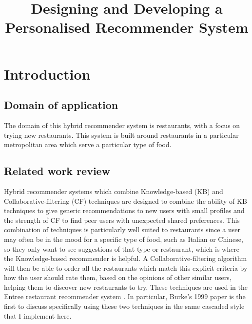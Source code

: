 \documentclass[conference]{IEEEtran}
\begin{document}
\title{Designing and Developing a Personalised Recommender System}

\author{
}

\maketitle


\section{Introduction}

\subsection{Domain of application}
The domain of this hybrid recommender system is restaurants, with a focus on trying new restaurants. 
This system is built around restaurants in a particular metropolitan area which serve a particular 
type of food. 

\subsection{Related work review}
Hybrid recommender systems which combine Knowledge-based (KB) and Collaborative-filtering (CF) techniques 
are designed to combine the ability of KB techniques to give generic recommendations to new users with 
small profiles and the strength of CF to find peer users with unexpected shared preferences. 
This combination of techniques is particularly well suited to restaurants since a user may often be in the 
mood for a specific type of food, such as Italian or Chinese, so they only want to see suggestions of that 
type or restaurant, which is where the Knowledge-based recommender is helpful. 
A Collaborative-filtering algorithm will then be able to order all the restaurants which match this 
explicit criteria by how the user should rate them, based on the opinions of other similar users, 
helping them to discover new restaurants to try. 
These techniques are used in the Entree restaurant recommender system \cite{burke1999integrating,burke2000knowledge,burke2002hybrid,burke2007hybrid}. 
In particular, Burke's 1999 paper \cite{burke1999integrating} is the first to discuss specifically using these 
two techniques in the same cascaded style that I implement here. 
\end{document}
